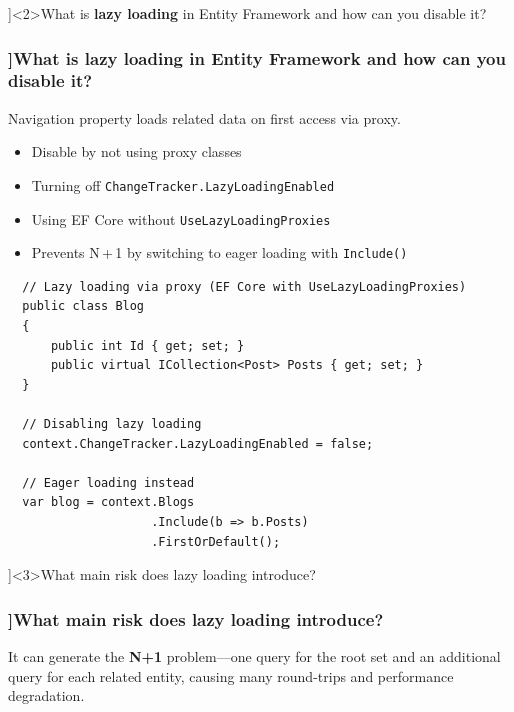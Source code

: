 \QuestionSlide[\CategoryBadge[PerfColor!20]{Async \& Threading}]<2>{What is \textbf{lazy loading} in Entity Framework and how can you disable it?}

\begin{frame}[fragile]
  \frametitle{\AnswerTitle[\CategoryBadge[OOPColor!20]{C\#} ]{What is \textbf{lazy loading} in Entity Framework and how can you disable it?}}

  {\footnotesize
  Navigation property loads related data on first access via proxy.
  \begin{itemize}
    \item Disable by not using proxy classes
    \item Turning off \texttt{ChangeTracker.LazyLoadingEnabled}
    \item Using EF Core without \texttt{UseLazyLoadingProxies}
    \item Prevents N\,+\,1 by switching to eager loading with \texttt{Include()}
  \end{itemize}
  }

  \begin{verbatim}
  // Lazy loading via proxy (EF Core with UseLazyLoadingProxies)
  public class Blog
  {
      public int Id { get; set; }
      public virtual ICollection<Post> Posts { get; set; }
  }

  // Disabling lazy loading
  context.ChangeTracker.LazyLoadingEnabled = false;

  // Eager loading instead
  var blog = context.Blogs
                    .Include(b => b.Posts)
                    .FirstOrDefault();
  \end{verbatim}
\end{frame}

\QuestionSlide[\CategoryBadge[PerfColor!20]{Async \& Threading}]<3>{What main risk does lazy loading introduce?}

\begin{frame}[fragile]
  \frametitle{\AnswerTitle[\CategoryBadge[OOPColor!20]{C\#} ]{What main risk does lazy loading introduce?}}

  {\footnotesize
  It can generate the \textbf{N+1} problem—one query for the root set and
  an additional query for each related entity, causing many round-trips
  and performance degradation.
  }
\end{frame}

